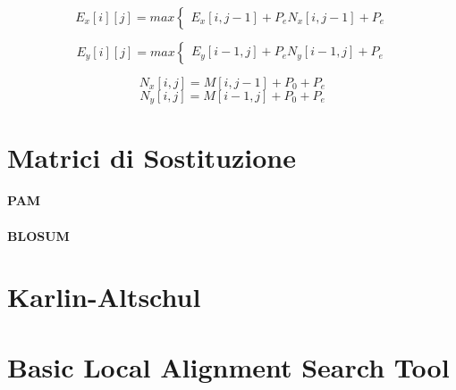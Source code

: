 \[
E_x[i][j] = max
\begin{cases}
  E_x[i,j-1] + P_e
  N_x[i,j-1] + P_e
\end{cases}
\]

\[
E_y[i][j] = max
\begin{cases}
  E_y[i-1,j] + P_e
  N_y[i-1,j] + P_e
\end{cases}
\]

\[ N_x[i,j] = M[i,j-1] + P_0 + P_e \]
\[ N_y[i,j] = M[i-1,j] + P_0 + P_e \]

\section{Matrici di Sostituzione}

\paragraph{PAM}

\paragraph{BLOSUM}

\section{Karlin-Altschul}

\section{Basic Local Alignment Search Tool}
